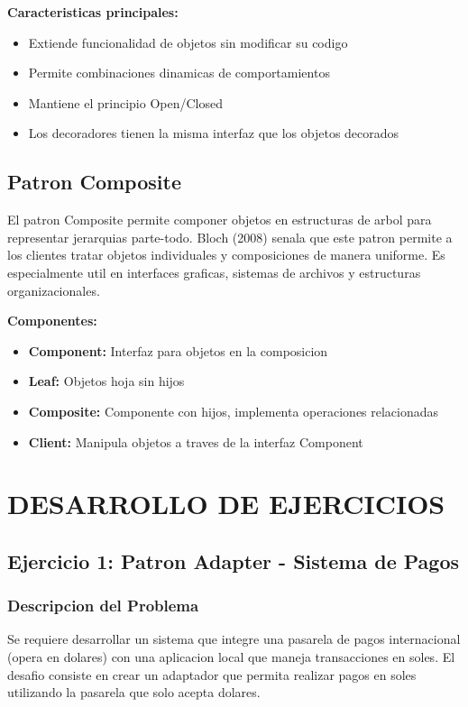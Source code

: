 \documentclass[11pt,a4paper]{article}
\begin{document}
\textbf{Caracteristicas principales:}
\begin{itemize}
    \item Extiende funcionalidad de objetos sin modificar su codigo
    \item Permite combinaciones dinamicas de comportamientos
    \item Mantiene el principio Open/Closed
    \item Los decoradores tienen la misma interfaz que los objetos decorados
\end{itemize}

\subsection{Patron Composite}

El patron Composite permite componer objetos en estructuras de arbol para representar jerarquias parte-todo. Bloch (2008) senala que este patron permite a los clientes tratar objetos individuales y composiciones de manera uniforme. Es especialmente util en interfaces graficas, sistemas de archivos y estructuras organizacionales.

\textbf{Componentes:}
\begin{itemize}
    \item \textbf{Component:} Interfaz para objetos en la composicion
    \item \textbf{Leaf:} Objetos hoja sin hijos
    \item \textbf{Composite:} Componente con hijos, implementa operaciones relacionadas
    \item \textbf{Client:} Manipula objetos a traves de la interfaz Component
\end{itemize}

\section{DESARROLLO DE EJERCICIOS}

\subsection{Ejercicio 1: Patron Adapter - Sistema de Pagos}

\subsubsection{Descripcion del Problema}

Se requiere desarrollar un sistema que integre una pasarela de pagos internacional (opera en dolares) con una aplicacion local que maneja transacciones en soles. El desafio consiste en crear un adaptador que permita realizar pagos en soles utilizando la pasarela que solo acepta dolares.
\end{document}
